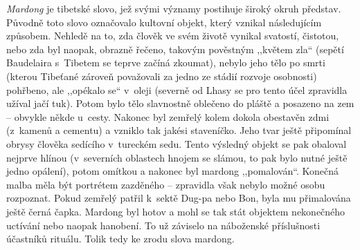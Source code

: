 \begin{pairs}
\begin{Rightside}
\pstart
\noindent
\textit{Mardong} je tibetské slovo, jež svými významy postihuje široký okruh představ. Původně toto slovo označovalo kultovní objekt, který vznikal následujícím způsobem. Nehledě na to, zda člověk ve svém životě vynikal svatostí, čistotou, nebo zda byl naopak, obrazně řečeno, takovým pověstným ,,květem zla`` (sepětí Baudelaira s~Tibetem se teprve začíná zkoumat), nebylo jeho tělo po smrti (kterou Tibeťané zároveň považovali za jedno ze stádií rozvoje osobnosti) pohřbeno, ale ,,opékalo se`` v~oleji (severně od Lhasy se pro tento účel zpravidla užíval jačí tuk). Potom bylo tělo slavnostně oblečeno do pláště a posazeno na zem -- obvykle někde u~cesty. Nakonec byl zemřelý kolem dokola obestavěn zdmi (z~kamenů a cementu) a vzniklo tak jakési staveníčko. Jeho tvar ještě připomínal obrysy člověka sedícího v~tureckém sedu. Tento výsledný objekt se pak obaloval nejprve hlínou (v~severních oblastech hnojem se slámou, to pak bylo nutné ještě jedno opálení), potom omítkou a nakonec byl mardong ,,pomalován``. Konečná malba měla být portrétem zazděného -- zpravidla však nebylo možné osobu rozpoznat. Pokud zemřelý patřil k~sektě Dug-pa nebo Bon, byla mu přimalována ještě černá čapka. Mardong byl hotov a mohl se tak stát objektem nekonečného uctívání nebo naopak hanobení. To už záviselo na náboženské příslušnosti účastníků rituálu. Tolik tedy ke zrodu slova mardong.
\pend
\endnumbering
\end{Rightside}
\Columns
\end{pairs}



